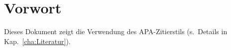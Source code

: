 \chapter{Vorwort}

Dieses Dokument zeigt die Verwendung des APA-Zitierstils (s.\ Details in Kap.~\ref{cha:Literatur}).
